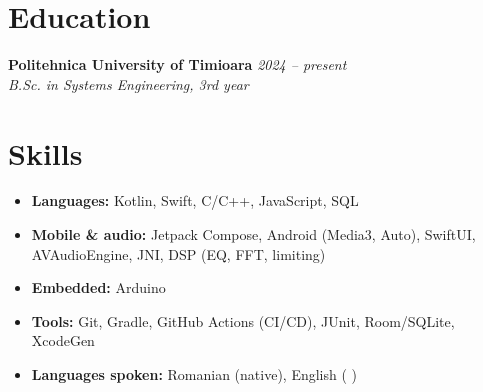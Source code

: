\documentclass[10pt,a4paper]{article}
\newcommand{\entry}[3]{\textbf{#1} \hfill \textit{#3}\\[-0.1em]\textit{#2}}
\begin{document}
\section{Education}
\entry{Politehnica University of Timioara}{B.Sc. in Systems Engineering, 3rd year}{2024 -- present}

\section{Skills}
\begin{itemize}[itemsep=1pt]
  \item \textbf{Languages:} Kotlin, Swift, C/C++, JavaScript, SQL
  \item \textbf{Mobile \& audio:} Jetpack Compose, Android (Media3, Auto), SwiftUI, AVAudioEngine, JNI, DSP (EQ, FFT, limiting)
  \item \textbf{Embedded:} Arduino
  \item \textbf{Tools:} Git, Gradle, GitHub Actions (CI/CD), JUnit, Room/SQLite, XcodeGen
  \item \textbf{Languages spoken:} Romanian (native), English (%
  )
\end{itemize}
\end{document}

